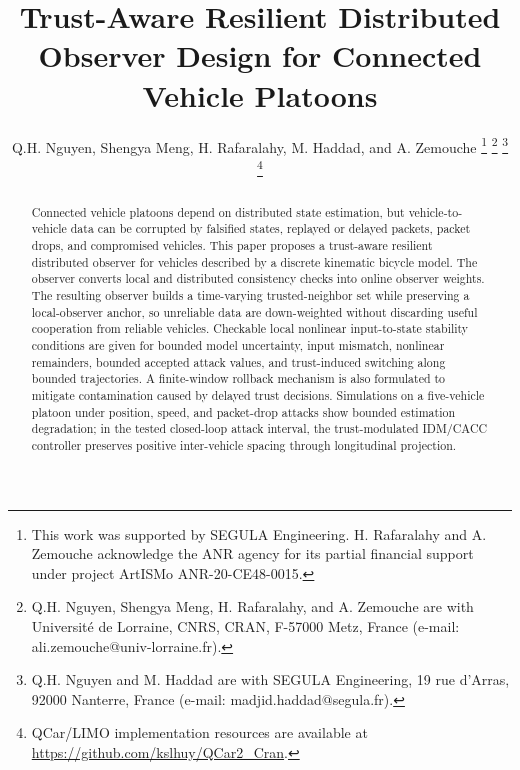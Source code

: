 \documentclass[journal,twoside]{IEEEtran}
\begin{document}
\title{Trust-Aware Resilient Distributed Observer Design for Connected Vehicle Platoons}
\author{Q.H. Nguyen, Shengya Meng, H. Rafaralahy, M. Haddad, and A. Zemouche%
\thanks{This work was supported by SEGULA Engineering. H. Rafaralahy and A. Zemouche acknowledge the ANR agency for its partial financial support under project ArtISMo ANR-20-CE48-0015.}%
\thanks{Q.H. Nguyen, Shengya Meng, H. Rafaralahy, and A. Zemouche are with Universit\'e de Lorraine, CNRS, CRAN, F-57000 Metz, France (e-mail: ali.zemouche@univ-lorraine.fr).}%
\thanks{Q.H. Nguyen and M. Haddad are with SEGULA Engineering, 19 rue d'Arras, 92000 Nanterre, France (e-mail: madjid.haddad@segula.fr).}%
\thanks{QCar/LIMO implementation resources are available at \protect\url{https://github.com/kslhuy/QCar2_Cran}.}}

\maketitle

\begin{abstract}
Connected vehicle platoons depend on distributed state estimation, but vehicle-to-vehicle data can be corrupted by falsified states, replayed or delayed packets, packet drops, and compromised vehicles. This paper proposes a trust-aware resilient distributed observer for vehicles described by a discrete kinematic bicycle model. The observer converts local and distributed consistency checks into online observer weights. The resulting observer builds a time-varying trusted-neighbor set while preserving a local-observer anchor, so unreliable data are down-weighted without discarding useful cooperation from reliable vehicles. Checkable local nonlinear input-to-state stability conditions are given for bounded model uncertainty, input mismatch, nonlinear remainders, bounded accepted attack values, and trust-induced switching along bounded trajectories. A finite-window rollback mechanism is also formulated to mitigate contamination caused by delayed trust decisions. Simulations on a five-vehicle platoon under position, speed, and packet-drop attacks show bounded estimation degradation; in the tested closed-loop attack interval, the trust-modulated IDM/CACC controller preserves positive inter-vehicle spacing through longitudinal projection.
\end{abstract}
\end{document}
